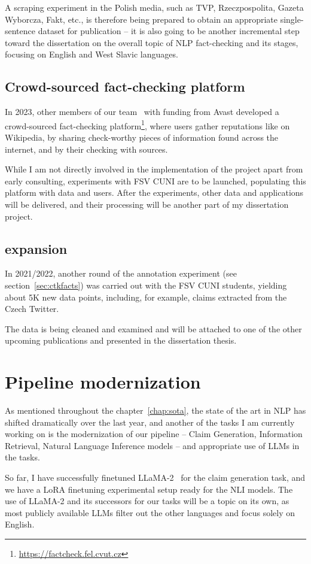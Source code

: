 A scraping experiment in the Polish media, such as TVP, Rzeczpospolita, Gazeta Wyborcza, Fakt, etc., is therefore being prepared to obtain an appropriate single-sentence dataset for publication -- it is also going to be another incremental step toward the dissertation on the overall topic of NLP fact-checking and its stages, focusing on English and West Slavic languages. 

\subsection{Crowd-sourced fact-checking platform}
In 2023, other members of our team~\cite{butora} with funding from Avast developed a crowd-sourced fact-checking platform\footnote{\url{https://factcheck.fel.cvut.cz}}, where users gather reputations like on Wikipedia, by sharing check-worthy pieces of information found across the internet, and by their checking with sources.

While I am not directly involved in the implementation of the project apart from early consulting, experiments with FSV CUNI are to be launched, populating this platform with data and users. 
After the experiments, other data and applications will be delivered, and their processing will be another part of my dissertation project.

\subsection{\CTK expansion}
In 2021/2022, another round of the \CTK annotation experiment (see section~\ref{sec:ctkfacts}) was carried out with the FSV CUNI students, yielding about 5K new data points, including, for example, claims extracted from the Czech Twitter.

The data is being cleaned and examined and will be attached to one of the other upcoming publications and presented in the dissertation thesis.

\section{Pipeline modernization}
As mentioned throughout the chapter~\ref{chap:sota}, the state of the art in NLP has shifted dramatically over the last year, and another of the tasks I am currently working on is the modernization of our pipeline -- Claim Generation, Information Retrieval, Natural Language Inference models -- and appropriate use of LLMs in the tasks.

So far, I have successfully finetuned LLaMA-2~\cite{llama2} for the claim generation task, and we have a LoRA finetuning experimental setup ready for the NLI models.
The use of LLaMA-2 and its successors for our tasks will be a topic on its own, as most publicly available LLMs filter out the other languages and focus solely on English.

